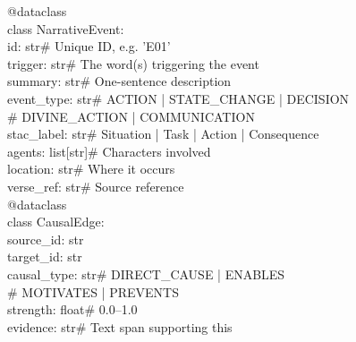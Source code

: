\documentclass[11pt]{article}
\theoremstyle{rukha}
\begin{document}
\begin{small}\ttfamily{}
\noindent
@dataclass\\
class NarrativeEvent:\\
\hspace*{2em}id: str\hfill\# Unique ID, e.g. 'E01'\\
\hspace*{2em}trigger: str\hfill\# The word(s) triggering the event\\
\hspace*{2em}summary: str\hfill\# One-sentence description\\
\hspace*{2em}event\_type: str\hfill\# ACTION | STATE\_CHANGE | DECISION\\
\hspace*{2em}\hspace*{2em}\hspace*{6em}\hfill\# DIVINE\_ACTION | COMMUNICATION\\
\hspace*{2em}stac\_label: str\hfill\# Situation | Task | Action | Consequence\\
\hspace*{2em}agents: list[str]\hfill\# Characters involved\\
\hspace*{2em}location: str\hfill\# Where it occurs\\
\hspace*{2em}verse\_ref: str\hfill\# Source reference\\[0.4em]
@dataclass\\
class CausalEdge:\\
\hspace*{2em}source\_id: str\\
\hspace*{2em}target\_id: str\\
\hspace*{2em}causal\_type: str\hfill\# DIRECT\_CAUSE | ENABLES\\
\hspace*{2em}\hspace*{2em}\hspace*{6em}\hfill\# MOTIVATES | PREVENTS\\
\hspace*{2em}strength: float\hfill\# 0.0–1.0\\
\hspace*{2em}evidence: str\hfill\# Text span supporting this
\end{small}
\end{document}
